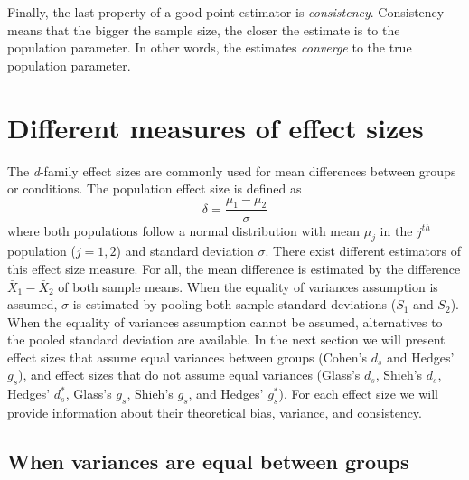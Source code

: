 \documentclass[
  english,
  man,floatsintext]{apa6}
\begin{document}
Finally, the last property of a good point estimator is \emph{consistency}. Consistency means that the bigger the sample size, the closer the estimate is to the population parameter. In other words, the estimates \emph{converge} to the true population parameter.

\hypertarget{different-measures-of-effect-sizes}{%
\section{Different measures of effect sizes}\label{different-measures-of-effect-sizes}}

The \emph{d}-family effect sizes are commonly used for mean differences between groups or conditions. The population effect size is defined as
\begin{equation} 
\delta = \frac{\mu_{1}-\mu_{2}}{\sigma} 
\label{eq:Cohendelta}
\end{equation}
where both populations follow a normal distribution with mean \(\mu_j\) in the \(j^{th}\) population (\(j=1,2\)) and standard deviation \(\sigma\). There exist different estimators of this effect size measure. For all, the mean difference is estimated by the difference \(\bar{X}_1-\bar{X}_2\) of both sample means. When the equality of variances assumption is assumed, \(\sigma\) is estimated by pooling both sample standard deviations (\(S_1\) and \(S_2\)). When the equality of variances assumption cannot be assumed, alternatives to the pooled standard deviation are available. In the next section we will present effect sizes that assume equal variances between groups (Cohen's \(d_s\) and Hedges' \(g_s\)), and effect sizes that do not assume equal variances (Glass's \(d_s\), Shieh's \(d_s\), Hedges' \(d^*_s\), Glass's \(g_s\), Shieh's \(g_s\), and Hedges' \(g^*_s\)). For each effect size we will provide information about their theoretical bias, variance, and consistency.

\hypertarget{when-variances-are-equal-between-groups}{%
\subsection{When variances are equal between groups}\label{when-variances-are-equal-between-groups}}
\end{document}

